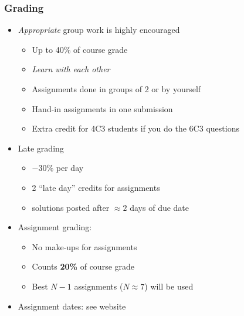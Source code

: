 \begin{frame}\frametitle{Grading}
	
	\begin{itemize}
		\item	\emph{Appropriate} group work is highly encouraged 
		\begin{itemize}
			\item	Up to 40\% of course grade 
			\item	\emph{Learn with each other} 
			\item	Assignments done in groups of 2 or by yourself 
			\item	Hand-in assignments in one submission 
			\item	Extra credit for 4C3 students if you do the 6C3 questions
		\end{itemize}
		\item	Late grading 
		\begin{itemize}
			\item	\( -30 \)\% per day
			\item	2 ``late day'' credits for assignments 
			\item	solutions posted after $\approx 2$ days of due date 
		\end{itemize}
		\item	Assignment grading: 
		\begin{itemize}
			\item	No make-ups for assignments 
			\item	Counts \textbf{20\%} of course grade 
			\item	Best $N-1$ assignments ($N \approx 7$) will be used 
		\end{itemize}
		\item	Assignment dates: see website 
	\end{itemize}
\end{frame}

